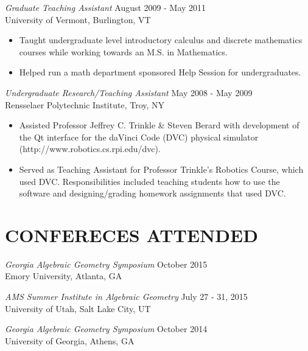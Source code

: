 \documentclass[line,overlapped]{res}
\begin{document}
\begin{resume}
                  {\sl Graduate Teaching Assistant} \hfill August 2009 - May 2011 \\
                  University of Vermont, Burlington, VT
                  \begin{itemize}  \itemsep -2pt %
                  \item
                    Taught undergraduate level introductory calculus and discrete mathematics courses while working towards an M.S. in Mathematics.
                  \item 
                    Helped run a math department sponsored Help Session for undergraduates.
                  \end{itemize}

                  {\sl Undergraduate Research/Teaching Assistant} \hfill May 2008 - May 2009 \\
                  Rensselaer Polytechnic Institute, Troy, NY
                  \begin{itemize}  \itemsep -2pt %
                  \item Assisted Professor Jeffrey C. Trinkle \& Steven Berard with development of the Qt interface for the daVinci Code (DVC) physical simulator\\ (http://www.robotics.cs.rpi.edu/dvc).
                  \item Served as Teaching Assistant for Professor Trinkle's Robotics Course, which used DVC.
                    Responsibilities included teaching students how to use the software and designing/grading homework assignments that used DVC.
                  \end{itemize}

                  \section{CONFERECES ATTENDED}
                          {\sl Georgia Algebraic Geometry Symposium} \hfill October 2015\\
                          Emory University, Atlanta, GA

                          {\sl AMS Summer Institute in Algebraic Geometry} \hfill July 27 - 31, 2015\\
                          University of Utah, Salt Lake City, UT

                          {\sl Georgia Algebraic Geometry Symposium} \hfill October 2014\\
                          University of Georgia, Athens, GA


\end{resume}
\end{document}
